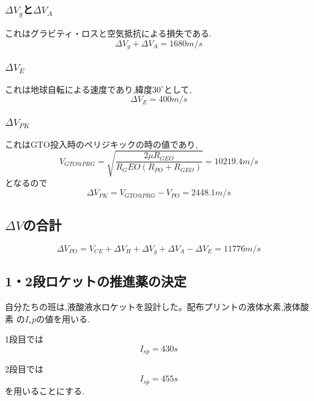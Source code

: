 \documentclass[15pt,uplatex,dvipdfmx]{jsarticle}
\begin{document}
\subsubsection{$\Delta V_g$と$\Delta V_A$}
これはグラビティ・ロスと空気抵抗による損失である.
\begin{equation}
  \Delta V_g + \Delta V_A = 1680m/s
\end{equation}
\subsubsection{$\Delta V_E$}
これは地球自転による速度であり,緯度$30^\circ$として,
\begin{equation}
  \Delta V_E = 400m/s
\end{equation}
\subsubsection{$\Delta V_{PK}$}
これはGTO投入時のペリジキックの時の値であり,
\begin{equation}
  V_{GTO@PRG} =  \sqrt{\frac{2\mu R_{GEO}}{R_GEO(R_{PO}+R_{GEO})}}=10219.4m/s
\end{equation}
となるので
\begin{equation}
  \Delta V_{PK} = V_{GTO@PRG} - V_{PO} = 2448.1m/s
\end{equation}

\subsection{$\Delta V$の合計}
\begin{equation}
  \Delta V_{PO} =V_{CE} + \Delta V_H + \Delta V_g + \Delta V_A - \Delta V_E = 11776m/s
\end{equation}

\subsection{1・2段ロケットの推進薬の決定}
自分たちの班は,液酸液水ロケットを設計した。配布プリントの液体水素,液体酸素
の$I_sp$の値を用いる.

1段目では
\begin{equation}
  I_{sp} = 430s
\end{equation}

2段目では
\begin{equation}
 I_{sp} = 455s
 \end{equation}
を用いることにする.
\end{document}
